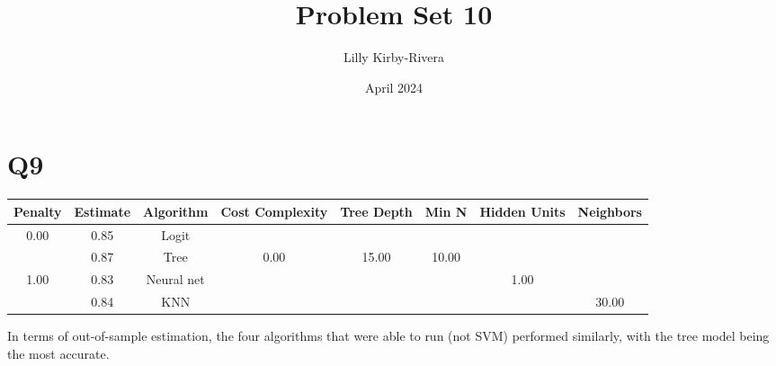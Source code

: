 \documentclass{article}
\title{Problem Set 10}
\author{Lilly Kirby-Rivera}
\date{April 2024}
\begin{document}
\maketitle

\section*{Q9}
\begin{center}
    \begin{tabular}{cccccccc}
         Penalty & Estimate & Algorithm & Cost Complexity & Tree Depth & Min N & Hidden Units & Neighbors \\
         \hline
         0.00 & 0.85 & Logit &  &  &  &  & \\
         & 0.87 & Tree & 0.00 & 15.00 & 10.00 &  & \\
        1.00 & 0.83 & Neural net &  &  &  & 1.00 & \\
         & 0.84 & KNN &  &  &  &  & 30.00 \\
         \hline
    \end{tabular}
\end{center}
    
    
\vskip 0.2in

In terms of out-of-sample estimation, the four algorithms that were able to run (not SVM) performed similarly, with the tree model being the most accurate.
\end{document}
